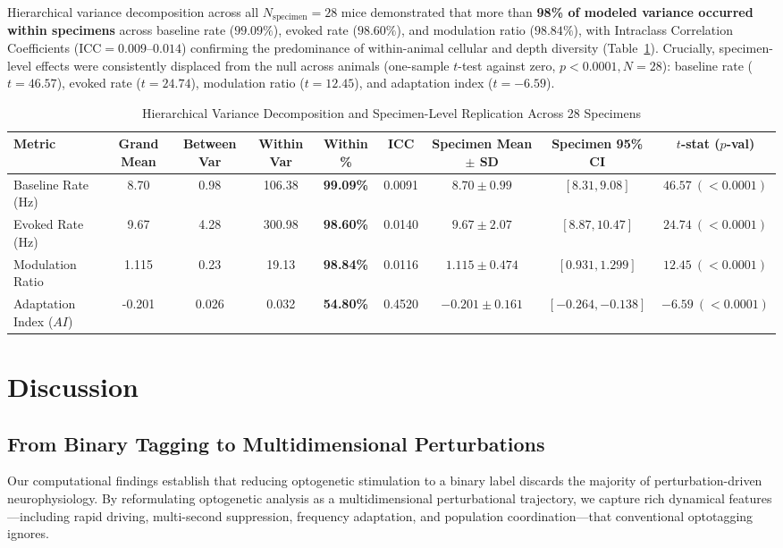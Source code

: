 \documentclass[10pt,journal,compsoc]{IEEEtran}
\begin{document}
Hierarchical variance decomposition across all $N_{\text{specimen}}=28$ mice demonstrated that more than \textbf{98\% of modeled variance occurred within specimens} across baseline rate ($99.09\%$), evoked rate ($98.60\%$), and modulation ratio ($98.84\%$), with Intraclass Correlation Coefficients ($\text{ICC} = 0.009–0.014$) confirming the predominance of within-animal cellular and depth diversity (Table~\ref{tab:reproducibility}). Crucially, specimen-level effects were consistently displaced from the null across animals (one-sample $t$-test against zero, $p < 0.0001, N=28$): baseline rate ($t=46.57$), evoked rate ($t=24.74$), modulation ratio ($t=12.45$), and adaptation index ($t=-6.59$).

\begin{table}[t]
\caption{Hierarchical Variance Decomposition and Specimen-Level Replication Across 28 Specimens}
\label{tab:reproducibility}
\centering
\begin{tabularx}{\textwidth}{lcccccccc}
\toprule
\textbf{Metric} & \textbf{Grand Mean} & \textbf{Between Var} & \textbf{Within Var} & \textbf{Within \%} & \textbf{ICC} & \textbf{Specimen Mean $\pm$ SD} & \textbf{Specimen 95\% CI} & \textbf{$t$-stat ($p$-val)} \\
\midrule
Baseline Rate (Hz)   & 8.70 & 0.98  & 106.38 & \textbf{99.09\%} & 0.0091 & $8.70 \pm 0.99$ & $[8.31, 9.08]$ & $46.57 \ (<0.0001)$ \\
Evoked Rate (Hz)     & 9.67 & 4.28  & 300.98 & \textbf{98.60\%} & 0.0140 & $9.67 \pm 2.07$ & $[8.87, 10.47]$& $24.74 \ (<0.0001)$ \\
Modulation Ratio     & 1.115& 0.23  & 19.13  & \textbf{98.84\%} & 0.0116 & $1.115 \pm 0.474$& $[0.931, 1.299]$& $12.45 \ (<0.0001)$ \\
Adaptation Index ($AI$)&-0.201&0.026 & 0.032  & \textbf{54.80\%} & 0.4520 & $-0.201 \pm 0.161$& $[-0.264, -0.138]$& $-6.59 \ (<0.0001)$ \\
\bottomrule
\end{tabularx}
\end{table}

\section{Discussion}

\subsection{From Binary Tagging to Multidimensional Perturbations}
Our computational findings establish that reducing optogenetic stimulation to a binary label discards the majority of perturbation-driven neurophysiology. By reformulating optogenetic analysis as a multidimensional perturbational trajectory, we capture rich dynamical features—including rapid driving, multi-second suppression, frequency adaptation, and population coordination—that conventional optotagging ignores.
\end{document}
